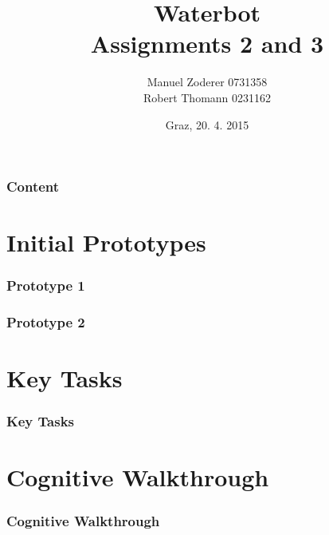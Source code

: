 \documentclass{beamer}
\title[Waterbot]{Waterbot\\Assignments 2 and 3}%
\author{Manuel Zoderer 0731358\\Robert Thomann 0231162}
\date{Graz, 20. 4. 2015}		%
\begin{document}
\titleframe


\begin{frame}
  \frametitle{Content}
  \tableofcontents%
\end{frame}


\section{Initial Prototypes} 

\begin{frame}
	\frametitle{Prototype 1}
\end{frame}

\begin{frame}
	\frametitle{Prototype 2}
\end{frame}


\section{Key Tasks}
\begin{frame}
	\frametitle{Key Tasks}
\end{frame}


\section{Cognitive Walkthrough}
\begin{frame}
	\frametitle{Cognitive Walkthrough}
\end{frame}
\end{document}
